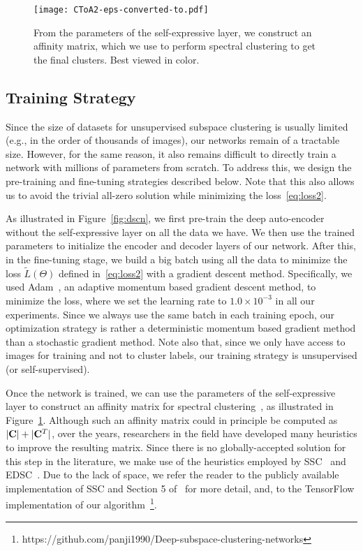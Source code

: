 \documentclass{article}
\begin{document}
\begin{figure}[!t]
\centering
\texttt{[image: CToA2-eps-converted-to.pdf]}
\caption{From the parameters of the self-expressive layer, we construct an affinity matrix, which we use to perform spectral clustering to get the final clusters. Best viewed in color.}\label{fig:CToA}
\vspace{-0.4cm}
\end{figure}

\subsection{Training Strategy}

Since the size of datasets for unsupervised subspace clustering is usually limited (e.g., in the order of thousands of images), our networks remain of a tractable size. However, for the same reason, it also remains difficult to directly train a network with millions of parameters from scratch. To address this, we design the pre-training and fine-tuning strategies described below. Note that this also allows us to avoid the trivial all-zero solution while minimizing the loss~\eqref{eq:loss2}. 

As illustrated in Figure~\ref{fig:dscn}, we first pre-train the deep auto-encoder without the self-expressive layer on all the data we have. We then use the trained parameters to initialize the encoder and decoder layers of our network. After this, in the fine-tuning stage, we build a big batch using all the data to minimize the loss $\tilde{L}(\Theta)$ defined in~\eqref{eq:loss2} with a gradient descent method. Specifically, we used Adam~\cite{kingma2014adam}, an adaptive momentum based gradient descent method, to minimize the loss, where we set the learning rate to $1.0\times 10^{-3}$ in all our experiments. Since we always use the same batch in each training epoch, our optimization strategy is rather a deterministic momentum based gradient method than a stochastic gradient method. 
Note also that, since we only have access to images for training and not to cluster labels, our training strategy is unsupervised (or self-supervised).

Once the network is trained, we can use the parameters of the self-expressive layer to construct an affinity matrix for spectral clustering~\cite{ng2001spectral}, as illustrated in Figure~\ref{fig:CToA}. Although such an affinity matrix could in principle be computed as $|{\bf C}|+|{\bf C}^T|$, over the years, researchers in the field have developed many heuristics to improve the resulting matrix. 
Since there is no globally-accepted solution for this step in the literature, we make use of the heuristics employed by SSC~\cite{elhamifar2013sparse} and EDSC~\cite{ji2014efficient}. Due to the lack of space, we refer the reader to the publicly available implementation of SSC and Section 5 of~\cite{ji2014efficient} for more detail, and, to the TensorFlow implementation of our algorithm~\footnote{https://github.com/panji1990/Deep-subspace-clustering-networks}.
\end{document}
